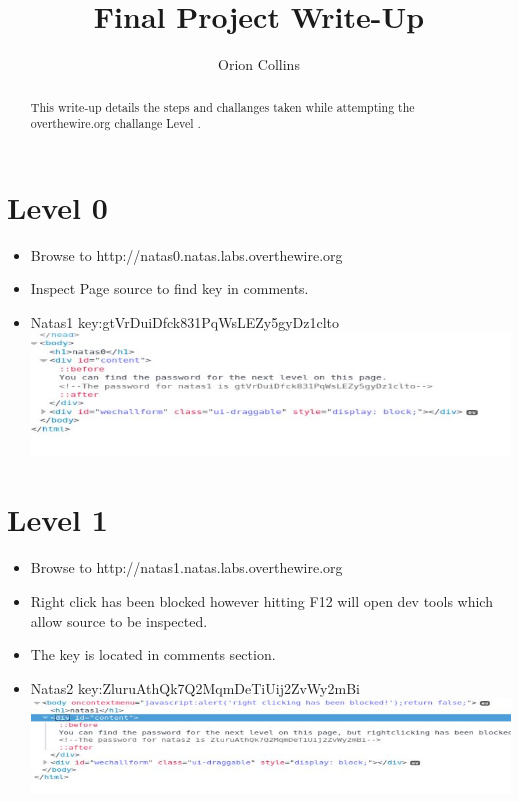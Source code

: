 \documentclass{article}
\begin{document}
\title{Final Project Write-Up}
\author{Orion Collins}
\maketitle

\begin{abstract}
    This write-up details the steps and challanges taken while attempting the overthewire.org challange Level .    
\end{abstract}
   
\section{Level 0} 
    \begin{itemize}
    \item Browse to http://natas0.natas.labs.overthewire.org
    \item Inspect Page source to find key in comments.
    \item Natas1 key:gtVrDuiDfck831PqWsLEZy5gyDz1clto\\ \includegraphics{natas0/natas0_flag}
    \end{itemize}


\section{Level 1}
    \begin{itemize}
        \item Browse to http://natas1.natas.labs.overthewire.org
        \item Right click has been blocked however hitting F12 will open dev tools which allow source to be inspected.
        \item The key is located in comments section.
        \item Natas2 key:ZluruAthQk7Q2MqmDeTiUij2ZvWy2mBi\\ \includegraphics{natas1/natas1_flag}
    \end{itemize}
   
\end{document}
